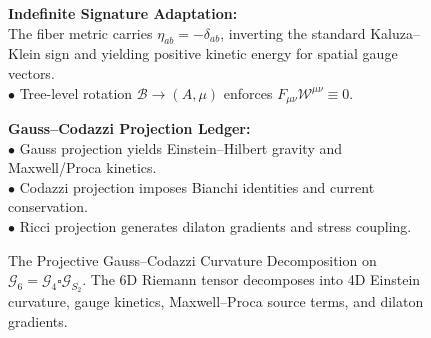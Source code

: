 \documentclass[
    12pt,
    a4paper,
    headings=normal,
    twoside=false,
    open=any,
    parskip=half
]{scrbook}
\begin{document}
\begin{figure}[htbp]
\par\vspace{2mm}
\begin{tcolorbox}[colback=white, colframe=secondarycolor!70, arc=2mm, boxrule=0.7pt, left=6pt, right=6pt, top=4pt, bottom=4pt, width=\linewidth]
\scriptsize\sffamily
\begin{minipage}[t]{0.48\textwidth}
  \textbf{\color{maincolor}Indefinite Signature Adaptation:}\\[1pt]
  The fiber metric carries $\eta_{ab} = -\delta_{ab}$, inverting the standard Kaluza--Klein sign and yielding positive kinetic energy for spatial gauge vectors.\\[1pt]
  $\bullet$ Tree-level rotation $\mathcal{B} \to (A, \mu)$ enforces $F_{\mu\nu}\mathcal{W}^{\mu\nu} \equiv 0$.
\end{minipage}\hfill
\begin{minipage}[t]{0.48\textwidth}
  \textbf{\color{accentcolor}Gauss--Codazzi Projection Ledger:}\\[1pt]
  $\bullet$ Gauss projection yields Einstein--Hilbert gravity and Maxwell/Proca kinetics.\\[1pt]
  $\bullet$ Codazzi projection imposes Bianchi identities and current conservation.\\[1pt]
  $\bullet$ Ricci projection generates dilaton gradients and stress coupling.
\end{minipage}
\end{tcolorbox}
\vspace{-2mm}
\caption{The Projective Gauss--Codazzi Curvature Decomposition on $\mathcal{G}_6 = \mathcal{G}_4 \square \mathcal{G}_{S_2}$. The 6D Riemann tensor decomposes into 4D Einstein curvature, gauge kinetics, Maxwell--Proca source terms, and dilaton gradients.}
\label{fig:ch2_gauss_codazzi_projection_tree}
\end{figure}
\end{document}
